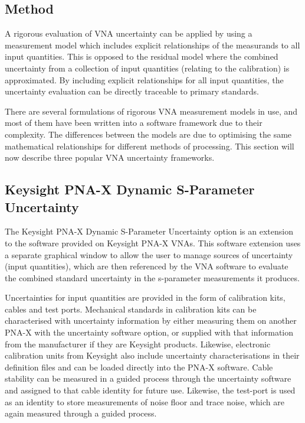 \documentclass[../thesis/thesis.tex]{subfiles}
\begin{document}
\subsection{Method}

A rigorous evaluation of VNA uncertainty can be applied by using a measurement model which includes explicit relationships of the measurands to all input quantities. This is opposed to the residual model where the combined uncertainty from a collection of input quantities (relating to the calibration) is approximated. By including explicit relationships for all input quantities, the uncertainty evaluation can be directly traceable to primary standards.

There are several formulations of rigorous VNA measurement models in use, and most of them have been written into a software framework due to their complexity. The differences between the models are due to optimising the same mathematical relationships for different methods of processing. This section will now describe three popular VNA uncertainty frameworks.

\subsection{Keysight PNA-X Dynamic S-Parameter Uncertainty}

The Keysight PNA-X Dynamic S-Parameter Uncertainty option is an extension to the software provided on Keysight PNA-X VNAs. This software extension uses a separate graphical window to allow the user to manage sources of uncertainty (input quantities), which are then referenced by the VNA software to evaluate the combined standard uncertainty in the s-parameter measurements it produces.

Uncertainties for input quantities are provided in the form of calibration kits, cables and test ports. Mechanical standards in calibration kits can be characterised with uncertainty information by either measuring them on another PNA-X with the uncertainty software option, or supplied with that information from the manufacturer if they are Keysight products. Likewise, electronic calibration units from Keysight also include uncertainty characterisations in their definition files and can be loaded directly into the PNA-X software. Cable stability can be measured in a guided process through the uncertainty software and assigned to that cable identity for future use. Likewise, the test-port is used as an identity to store measurements of noise floor and trace noise, which are again measured through a guided process.
\end{document}
